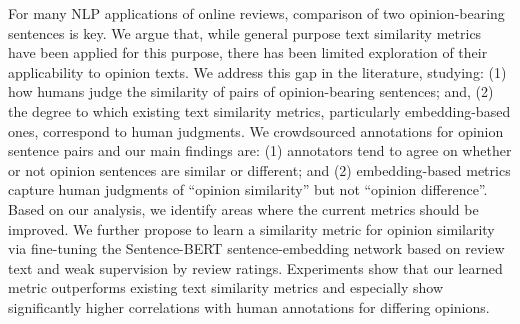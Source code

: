 For many NLP applications of online reviews, comparison of two opinion-bearing sentences is key.  We argue that, while general purpose text similarity metrics have been applied for this purpose,  there has been limited exploration of their applicability to opinion texts. We address this gap in the literature, studying: (1) how humans judge the similarity of pairs of opinion-bearing sentences; and, (2) the degree to which existing text similarity metrics,  particularly embedding-based ones, correspond to human judgments.  We crowdsourced annotations for opinion sentence pairs and our main findings are:  (1) annotators tend to agree on whether or not opinion sentences are similar or different; and (2) embedding-based metrics capture human judgments of ``opinion similarity'' but not ``opinion difference''. Based on our analysis,  we identify areas where the current metrics should be improved.  We further propose to learn a  similarity metric for opinion similarity via fine-tuning the Sentence-BERT sentence-embedding network based on review text and weak supervision by review ratings. Experiments show that our learned metric outperforms existing text similarity metrics and especially show significantly higher correlations with human annotations for differing opinions.
